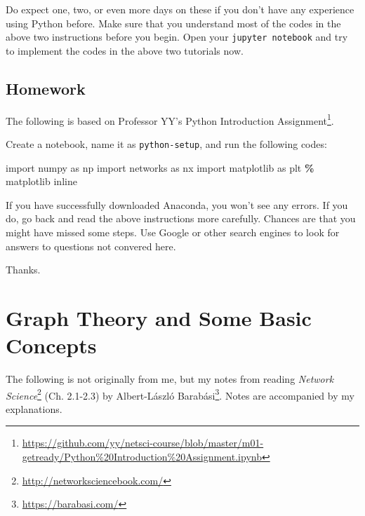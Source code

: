 \documentclass[
]{krantz}
\makeatletter
\newenvironment{Shaded}{\begin{snugshade}}{\end{snugshade}}
\newcommand{\ImportTok}[1]{#1}
\newcommand{\NormalTok}[1]{#1}
\newcommand{\OperatorTok}[1]{\textcolor[rgb]{0.43,0.43,0.43}{\textbf{#1}}}
\renewcommand{\href}[2]{#2\footnote{\url{#1}}}
\newenvironment{kframe}{%
\medskip{}
\setlength{\fboxsep}{.8em}
 \def\at@end@of@kframe{}%
 \ifinner\ifhmode%
  \def\at@end@of@kframe{\end{minipage}}%
  \begin{minipage}{\columnwidth}%
 \fi\fi%
 \def\FrameCommand##1{\hskip\@totalleftmargin \hskip-\fboxsep
 \colorbox{shadecolor}{##1}\hskip-\fboxsep
     \hskip-\linewidth \hskip-\@totalleftmargin \hskip\columnwidth}%
 \MakeFramed {\advance\hsize-\width
   \@totalleftmargin\z@ \linewidth\hsize
   \@setminipage}}%
 {\par\unskip\endMakeFramed%
 \at@end@of@kframe}
\renewenvironment{Shaded}{\begin{kframe}}{\end{kframe}}
\newenvironment{rmdblock}[1]
  {
  \begin{itemize}
  \renewcommand{\labelitemi}{
    \raisebox{-.7\height}[0pt][0pt]{
      {\setkeys{Gin}{width=3em,keepaspectratio}\texttt{[image: images/\#1]}}
    }
  }
  \setlength{\fboxsep}{1em}
  \begin{kframe}
  \item
  }
  {
  \end{kframe}
  \end{itemize}
  }
\newenvironment{rmdnote}
  {\begin{rmdblock}{note}}
  {\end{rmdblock}}
\makeatother
\begin{document}
Do expect one, two, or even more days on these if you don't have any experience using Python before. Make sure that you understand most of the codes in the above two instructions before you begin. Open your \texttt{jupyter\ notebook} and try to implement the codes in the above two tutorials now.

\hypertarget{homework}{%
\section{Homework}\label{homework}}

\begin{rmdnote}
The following is based on Professor YY's \href{https://github.com/yy/netsci-course/blob/master/m01-getready/Python\%20Introduction\%20Assignment.ipynb}{Python Introduction Assignment}.
\end{rmdnote}

Create a notebook, name it as \texttt{python-setup}, and run the following codes:

\begin{Shaded}
\begin{Highlighting}[]
\ImportTok{import}\NormalTok{ numpy }\ImportTok{as}\NormalTok{ np }
\ImportTok{import}\NormalTok{ networks }\ImportTok{as}\NormalTok{ nx}
\ImportTok{import}\NormalTok{ matplotlib }\ImportTok{as}\NormalTok{ plt}
\OperatorTok{\%}\NormalTok{ matplotlib inline}
\end{Highlighting}
\end{Shaded}

If you have successfully downloaded Anaconda, you won't see any errors. If you do, go back and read the above instructions more carefully. Chances are that you might have missed some steps. Use Google or other search engines to look for answers to questions not convered here.

Thanks.

\hypertarget{Graph}{%
\chapter{Graph Theory and Some Basic Concepts}\label{Graph}}

\begin{rmdnote}
The following is not originally from me, but my notes from reading \href{http://networksciencebook.com/}{\emph{Network Science}} (Ch. 2.1-2.3) by \href{https://barabasi.com/}{Albert-László Barabási}. Notes are accompanied by my explanations.
\end{rmdnote}
\end{document}
